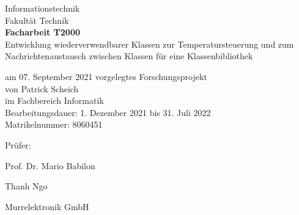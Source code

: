 \begin{titlepage}
\begin{center}
        \vspace{1cm} %
        \huge
        Informationstechnik\\
        Fakultät Technik\\
        \vspace{1cm} %
        \huge
        \textbf{Facharbeit T2000} \\
        \vspace{1cm} %
        \Large
        Entwicklung wiederverwendbarer Klassen zur Temperatursteuerung und zum Nachrichtenaustausch zwischen  Klassen für eine Klassenbibliothek  \\
        \vspace{0.75cm} %
    \end{center}    
    \normalsize
    \vfill %
    am 07. September 2021 vorgelegtes Forschungsprojekt \\
    von Patrick Scheich \\
    im Fachbereich Informatik\\
    Bearbeitungsdauer: 1. Dezember 2021 bis 31. Juli 2022\\
    Matrikelnummer: 8060451 \\
    \begin{labeling}{Prüfer: }
        \item[Prüfer:]\tabto{1cm} Prof. Dr. Mario Babilon
        \item
        \item[Betreuer:]\tabto{1cm} Thanh Ngo
        \item[Firma:]\tabto{1cm} Murrelektronik GmbH
    \end{labeling}
\end{titlepage}

